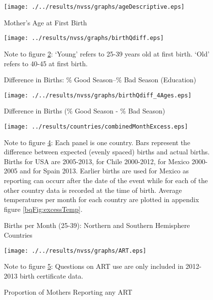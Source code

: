 \begin{figure}[htpb!]
  \begin{center}
  \caption{Mother's Age at First Birth}
  \label{bqFig:NVSSages}
  \texttt{[image: ./../results/nvss/graphs/ageDescriptive.eps]} 
  \end{center}
\end{figure}

\vspace{8mm}


\begin{figure}[htpb!]
  \begin{center}
  \caption{Difference in Births: \% Good Season--\% Bad Season (Education)}
  \label{bqFig:diffQ}
  \texttt{[image: ../results/nvss/graphs/birthQdiff.eps]}
  \end{center}
  {\footnotesize Note to figure \ref{bqFig:diffQ}: `Young' refers to 25-39 years
  old at first birth.  `Old' refers to 40-45 at first birth.}
\end{figure}


\begin{figure}[htpb!]
  \begin{center}
  \caption{Difference in Births (\% Good Season - \% Bad Season)}
  \label{fig:NVSSbirthsAges}
  \texttt{[image: ./../results/nvss/graphs/birthQdiff\_4Ages.eps]}
  \end{center}
\end{figure}

\begin{figure}[htpb!]
\begin{center}
\caption{Births per Month (25-39): Northern and Southern Hemisphere Countries}
\label{bqFig:excess}
\texttt{[image: ../results/countries/combinedMonthExcess.eps]}
\end{center}
{\footnotesize Note to figure \ref{bqFig:excess}: Each panel is one country.  Bars
represent the difference between expected (evenly spaced) births and actual births.  
Births for USA are 2005-2013, for Chile 2000-2012, for Mexico 2000-2005 and for Spain 
2013.  Earlier births are used for Mexico as reporting can occurr after the date of
the event while for each of the other country data is recorded at the time of birth.  
Average temperatures per month for each country are plotted in appendix figure 
\ref{bqFig:excessTemp}.}
\end{figure}
\vspace{5mm}

\begin{figure}[htpb!]
  \begin{center}
  \centering
  \caption{Proportion of Mothers Reporting any ART}
  \label{bqfig:NVSSART}
  \texttt{[image: ./../results/nvss/graphs/ART.eps]}
  \end{center}
  {\footnotesize Note to figure \ref{bqfig:NVSSART}: Questions on ART use are 
  only included in 2012-2013 birth certificate data.}
\end{figure}

